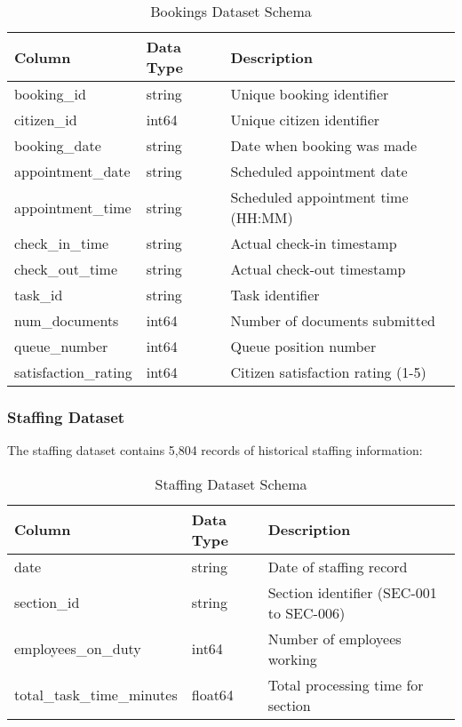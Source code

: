 \documentclass[12pt,a4paper]{article}
\begin{document}
\begin{table}[H]
\centering
\caption{Bookings Dataset Schema}
\begin{tabular}{@{}lll@{}}
\toprule
\textbf{Column} & \textbf{Data Type} & \textbf{Description} \\
\midrule
booking\_id & string & Unique booking identifier \\
citizen\_id & int64 & Unique citizen identifier \\
booking\_date & string & Date when booking was made \\
appointment\_date & string & Scheduled appointment date \\
appointment\_time & string & Scheduled appointment time (HH:MM) \\
check\_in\_time & string & Actual check-in timestamp \\
check\_out\_time & string & Actual check-out timestamp \\
task\_id & string & Task identifier \\
num\_documents & int64 & Number of documents submitted \\
queue\_number & int64 & Queue position number \\
satisfaction\_rating & int64 & Citizen satisfaction rating (1-5) \\
\bottomrule
\end{tabular}
\end{table}

\subsubsection{Staffing Dataset}

The staffing dataset contains 5,804 records of historical staffing information:

\begin{table}[H]
\centering
\caption{Staffing Dataset Schema}
\begin{tabular}{@{}lll@{}}
\toprule
\textbf{Column} & \textbf{Data Type} & \textbf{Description} \\
\midrule
date & string & Date of staffing record \\
section\_id & string & Section identifier (SEC-001 to SEC-006) \\
employees\_on\_duty & int64 & Number of employees working \\
total\_task\_time\_minutes & float64 & Total processing time for section \\
\bottomrule
\end{tabular}
\end{table}
\end{document}
